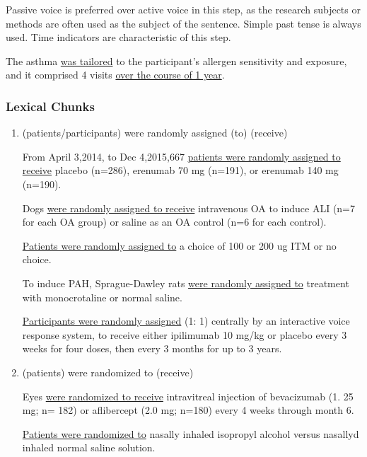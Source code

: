 \documentclass[a4paper]{ctexbook}
\begin{document}
    Passive voice is preferred over active voice in this step, as the research subjects or methods are often used as the subject of the sentence. Simple past tense is always used. Time indicators are characteristic of this step.

    \begin{eg}{}
      The asthma  \uline{was tailored} to the participant's allergen sensitivity and exposure, and it comprised 4 visits \uline{over the course of 1 year}.
    \end{eg}

    \subsubsection{Lexical Chunks}

    \begin{enumerate}
      \item (patients/participants) were randomly assigned (to) (receive)
      \begin{eg}{}
        From April 3,2014, to Dec 4,2015,667 \uline{patients were randomly assigned to receive} placebo (n=286), erenumab 70 mg (n=191), or erenumab 140 mg (n=190).
      \end{eg}

      \begin{eg}{}
        Dogs \uline{were randomly assigned to receive} intravenous OA to induce ALI (n=7 for each OA group) or saline as an OA control (n=6 for each control).
      \end{eg}

      \begin{eg}{}
        \uline{Patients were randomly assigned to} a choice of 100 or 200 ug ITM or no choice.
      \end{eg}

      \begin{eg}{}
        To induce PAH, Sprague-Dawley rats \uline{were randomly assigned to} treatment with monocrotaline or normal saline.
      \end{eg}

      \begin{eg}{}
        \uline{Participants were randomly assigned} (1: 1) centrally by an interactive voice response system, to receive either ipilimumab 10 mg/kg or placebo every 3 weeks for four doses, then every 3 months for up to 3 years.
      \end{eg}
      
      \item (patients) were randomized to (receive)
      \begin{eg}{}
        Eyes \uline{were randomized to receive} intravitreal injection of bevacizumab (1. 25 mg; n= 182) or aflibercept (2.0 mg; n=180) every 4 weeks through month 6.
      \end{eg}
      \begin{eg}{}
        \uline{Patients were randomized to} nasally inhaled isopropyl alcohol versus nasallyd inhaled normal saline solution.
      \end{eg}


\end{enumerate}
\end{document}
